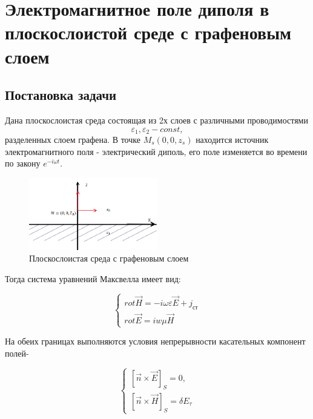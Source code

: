 	\newpage
	
	\section{Электромагнитное поле диполя в плоскослоистой среде с графеновым  слоем}
	
	\subsection{Постановка задачи}
	
	Дана плоскослоистая среда состоящая из 2х слоев с различными проводимостями $$\varepsilon_1, \varepsilon_2 - const, $$разделенных слоем графена. 
	В точке $M_s(0,0,z_s) $ находится источник электромагнитного поля - электрический диполь, его поле изменяется во времени по закону $e^{-i\omega t}$.
	
	\begin{figure}[h] %
		\centering %
		\includegraphics[width=0.5\textwidth]{Рис 6.PNG} %
		\caption{Плоскослоистая среда с графеновым слоем} %
		\label{fig:example6} %
	\end{figure}
	
	Тогда система уравнений Максвелла имеет вид:
	
	
	\begin{equation}
		\begin{cases} rot \vec{H} = -i \omega \varepsilon \vec{E} + j_{ст} \\ rot \vec{E} = iw\mu \vec{H} \end{cases}
	\end{equation}
	
	На обеих границах выполняются условия непрерывности касательных компонент полей-
	
	\begin{equation}
		\begin{cases}
			[\vec{n} \times \vec{E} ]_S = 0, \\
			[\vec{n} \times \vec{H}]_S = \delta E_{\tau} 
		\end{cases}
	\end{equation}
	
